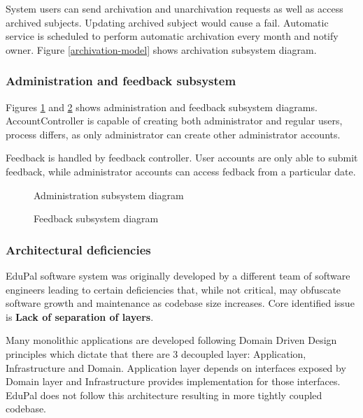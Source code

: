 \documentclass[
    english, %
]{VUMIFPSkursinis}
\begin{document}
System users can send archivation and unarchivation requests as well as access archived subjects. Updating archived subject would cause a fail. Automatic service is scheduled to perform automatic archivation every month and notify owner. Figure \ref{archivation-model} shows archivation subsystem diagram.

\subsubsection{Administration and feedback subsystem}

Figures \ref{administration-model} and \ref{feedback-model} shows administration and feedback subsystem diagrams. AccountController is capable of creating both administrator and regular users, process differs, as only administrator can create other administrator accounts.

Feedback is handled by feedback controller. User accounts are only able to submit feedback, while administrator accounts can access fedback from a particular date.

\begin{figure}[ht]
    \centering
    
    \caption{Administration subsystem diagram}
    \label{administration-model}
\end{figure}

\begin{figure}[ht]
    \centering
    
    \caption{Feedback subsystem diagram}
    \label{feedback-model}
\end{figure}

\subsubsection{Architectural deficiencies}

EduPal software system was originally developed by a different team of software engineers leading to certain deficiencies that, while not critical, may obfuscate software growth and maintenance as codebase size increases. Core identified issue is \textbf{Lack of separation of layers}.

Many monolithic applications are developed following Domain Driven Design principles which dictate that there are 3 decoupled layer: Application, Infrastructure and Domain. Application layer depends on interfaces exposed by Domain layer and Infrastructure provides implementation for those interfaces. EduPal does not follow this architecture resulting in more tightly coupled codebase.
\end{document}
